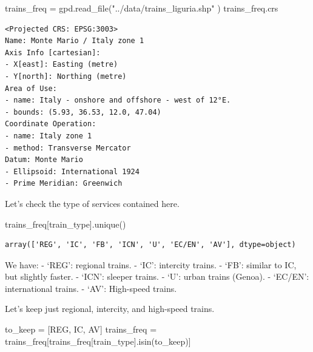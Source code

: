\documentclass[
  letterpaper,
  DIV=11,
  numbers=noendperiod]{scrreprt}
\newenvironment{Shaded}{\begin{snugshade}}{\end{snugshade}}
\newcommand{\NormalTok}[1]{\textcolor[rgb]{0.00,0.23,0.31}{#1}}
\newcommand{\OperatorTok}[1]{\textcolor[rgb]{0.37,0.37,0.37}{#1}}
\newcommand{\StringTok}[1]{\textcolor[rgb]{0.13,0.47,0.30}{#1}}
\begin{document}
\begin{Shaded}
\begin{Highlighting}[]
\NormalTok{trains\_freq }\OperatorTok{=}\NormalTok{ gpd.read\_file(}\StringTok{"../data/trains\_liguria.shp"}\NormalTok{ )}
\NormalTok{trains\_freq.crs}
\end{Highlighting}
\end{Shaded}

\begin{verbatim}
<Projected CRS: EPSG:3003>
Name: Monte Mario / Italy zone 1
Axis Info [cartesian]:
- X[east]: Easting (metre)
- Y[north]: Northing (metre)
Area of Use:
- name: Italy - onshore and offshore - west of 12°E.
- bounds: (5.93, 36.53, 12.0, 47.04)
Coordinate Operation:
- name: Italy zone 1
- method: Transverse Mercator
Datum: Monte Mario
- Ellipsoid: International 1924
- Prime Meridian: Greenwich
\end{verbatim}

Let's check the type of services contained here.

\begin{Shaded}
\begin{Highlighting}[]
\NormalTok{trains\_freq[}\StringTok{\textquotesingle{}train\_type\textquotesingle{}}\NormalTok{].unique()}
\end{Highlighting}
\end{Shaded}

\begin{verbatim}
array(['REG', 'IC', 'FB', 'ICN', 'U', 'EC/EN', 'AV'], dtype=object)
\end{verbatim}

We have: - `REG': regional trains. - `IC': intercity trains. - `FB':
similar to IC, but slightly faster. - `ICN': sleeper trains. - `U':
urban trains (Genoa). - `EC/EN': international trains. - `AV':
High-speed trains.

Let's keep just regional, intercity, and high-speed trains.

\begin{Shaded}
\begin{Highlighting}[]
\NormalTok{to\_keep }\OperatorTok{=}\NormalTok{ [}\StringTok{\textquotesingle{}REG\textquotesingle{}}\NormalTok{, }\StringTok{\textquotesingle{}IC\textquotesingle{}}\NormalTok{, }\StringTok{\textquotesingle{}AV\textquotesingle{}}\NormalTok{]}
\NormalTok{trains\_freq }\OperatorTok{=}\NormalTok{ trains\_freq[trains\_freq[}\StringTok{\textquotesingle{}train\_type\textquotesingle{}}\NormalTok{].isin(to\_keep)]}
\end{Highlighting}
\end{Shaded}
\end{document}
